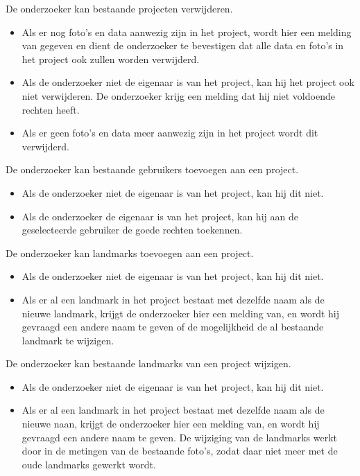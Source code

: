 De onderzoeker kan bestaande projecten verwijderen.
\begin{itemize}
	\item Als er nog foto's en data aanwezig zijn in het project, wordt hier een melding van gegeven en dient de onderzoeker te bevestigen dat alle data en foto's in het project ook zullen worden verwijderd.
	\item Als de onderzoeker niet de eigenaar is van het project, kan hij het project ook niet verwijderen. De onderzoeker krijg een melding dat hij niet voldoende rechten heeft.
	\item Als er geen foto's en data meer aanwezig zijn in het project wordt dit verwijderd.
\end{itemize}

De onderzoeker kan bestaande gebruikers toevoegen aan een project.
\begin{itemize}
	\item Als de onderzoeker niet de eigenaar is van het project, kan hij dit niet.
	\item Als de onderzoeker de eigenaar is van het project, kan hij aan de geselecteerde gebruiker de goede rechten toekennen.
\end{itemize}

De onderzoeker kan landmarks toevoegen aan een project.
\begin{itemize}
	\item Als de onderzoeker niet de eigenaar is van het project, kan hij dit niet.
	\item Als er al een landmark in het project bestaat met dezelfde naam als de nieuwe landmark, krijgt de onderzoeker hier een melding van, en wordt hij gevraagd een andere naam te geven of de mogelijkheid de al bestaande landmark te wijzigen.
\end{itemize}

De onderzoeker kan bestaande landmarks van een project wijzigen.
\begin{itemize}
	\item Als de onderzoeker niet de eigenaar is van het project, kan hij dit niet.
	\item Als er al een landmark in het project bestaat met dezelfde naam als de nieuwe naan, krijgt de onderzoeker hier een melding van, en wordt hij gevraagd een andere naam te geven. De wijziging van de landmarks werkt door in de metingen van de bestaande foto's, zodat daar niet meer met de oude landmarks gewerkt wordt.
\end{itemize}

